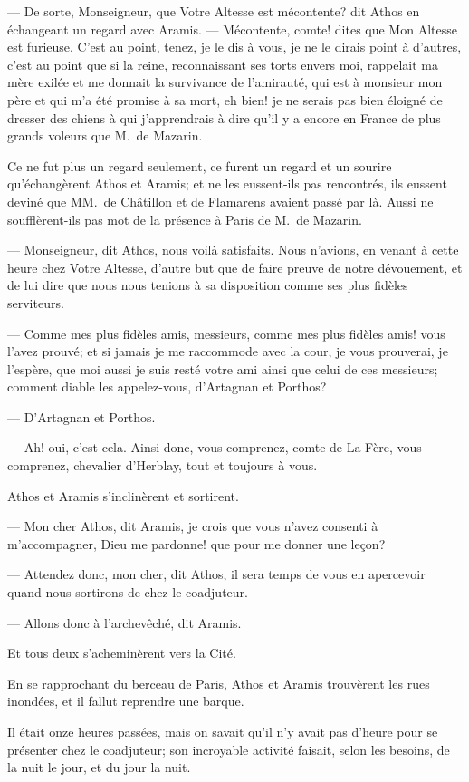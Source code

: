 — De sorte, Monseigneur, que Votre Altesse est mécontente? dit Athos en échangeant un regard avec Aramis.
— Mécontente, comte! dites que Mon Altesse est furieuse. C'est au point, tenez, je le dis à vous, je ne le dirais point à d'autres, c'est au point que si la reine, reconnaissant ses torts envers moi, rappelait ma mère exilée et me donnait la survivance de l'amirauté, qui est à monsieur mon père et qui m'a été promise à sa mort, eh bien! je ne serais pas bien éloigné de dresser des chiens à qui j'apprendrais à dire qu'il y a encore en France de plus grands voleurs que M.~de Mazarin.

Ce ne fut plus un regard seulement, ce furent un regard et un sourire qu'échangèrent Athos et Aramis; et ne les eussent-ils pas rencontrés, ils eussent deviné que MM.~de Châtillon et de Flamarens avaient passé par là. Aussi ne soufflèrent-ils pas mot de la présence à Paris de M.~de Mazarin.

— Monseigneur, dit Athos, nous voilà satisfaits. Nous n'avions, en venant à cette heure chez Votre Altesse, d'autre but que de faire preuve de notre dévouement, et de lui dire que nous nous tenions à sa disposition comme ses plus fidèles serviteurs.

— Comme mes plus fidèles amis, messieurs, comme mes plus fidèles amis! vous l'avez prouvé; et si jamais je me raccommode avec la cour, je vous prouverai, je l'espère, que moi aussi je suis resté votre ami ainsi que celui de ces messieurs; comment diable les appelez-vous, d'Artagnan et Porthos?

— D'Artagnan et Porthos.

— Ah! oui, c'est cela. Ainsi donc, vous comprenez, comte de La Fère, vous comprenez, chevalier d'Herblay, tout et toujours à vous.

Athos et Aramis s'inclinèrent et sortirent.

— Mon cher Athos, dit Aramis, je crois que vous n'avez consenti à m'accompagner, Dieu me pardonne! que pour me donner une leçon?

— Attendez donc, mon cher, dit Athos, il sera temps de vous en apercevoir quand nous sortirons de chez le coadjuteur.

— Allons donc à l'archevêché, dit Aramis.

Et tous deux s'acheminèrent vers la Cité.

En se rapprochant du berceau de Paris, Athos et Aramis trouvèrent les rues inondées, et il fallut reprendre une barque.

Il était onze heures passées, mais on savait qu'il n'y avait pas d'heure pour se présenter chez le coadjuteur; son incroyable activité faisait, selon les besoins, de la nuit le jour, et du jour la nuit.


